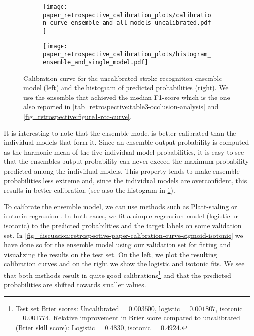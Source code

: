 \begin{figure}
    \begin{subfigure}[c]{0.48\columnwidth}
        \centering
        \texttt{[image: paper\_retrospective\_calibration\_plots/calibration\_curve\_ensemble\_and\_all\_models\_uncalibrated.pdf]}
    \end{subfigure}
    \begin{subfigure}[c]{0.48\columnwidth}
        \centering
        \texttt{[image: paper\_retrospective\_calibration\_plots/histogram\_ensemble\_and\_single\_model.pdf]}
    \end{subfigure}
    \caption[Calibration curve for the uncalibrated stroke recognition model and empirical distribution of predicted probabilities.]{%
        Calibration curve for the uncalibrated stroke recognition ensemble model (left) and the histogram of predicted probabilities (right). 
        We use the ensemble that achieved the median F1-score which is the one also reported in \cref{tab_retrospective:table3-occlusion-analysis} and \cref{fig_retrospective:figure1-roc-curve}.}
    \label{fig_discussion:retrospective-paper-calibration-curve-of-uncalibrated-model}
\end{figure}

It is interesting to note that the ensemble model is better calibrated than the individual models that form it. Since an ensemble output probability is computed as the harmonic mean of the five individual model probabilities, it is easy to see that the ensembles output probability can never exceed the maximum probability predicted among the individual models. This property tends to make ensemble probabilities less extreme and, since the individual models are overconfident, this results in better calibration (see also the histogram in \cref{fig_discussion:retrospective-paper-calibration-curve-of-uncalibrated-model}). 

To calibrate the ensemble model, we can use methods such as Platt-scaling \parencite{platt_probabilistic_1999} or isotonic regression \parencite{zadrozny_transforming_2002}. 
In both cases, we fit a simple regression model (logistic or isotonic) to the predicted probabilities and the target labels on some validation set. 
In \cref{fig_discussion:retrospective-paper-calibration-curve-sigmoid-isotonic} we have done so for the ensemble model using our validation set for fitting and visualizing the results on the test set. On the left, we plot the resulting calibration curves and on the right we show the logistic and isotonic fits. We see that both methods result in quite good calibrations\footnote{Test set Brier scores: Uncalibrated = $0.003500$, logistic = $0.001807$, isotonic = $0.001774$. Relative improvement in Brier score compared to uncalibrated (Brier skill score): Logistic = $0.4830$, isotonic = $0.4924$.} and that the predicted probabilities are shifted towards smaller values. 

